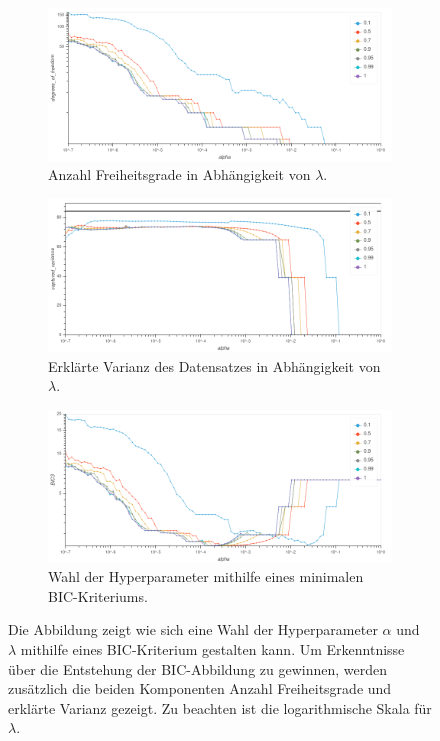 \begin{figure}
\centering
\begin{subfigure}{0.9\textwidth}
\includegraphics[width=\textwidth]{figures/Signal_0_degrees_of_freedom.png}
\caption{Anzahl Freiheitsgrade in Abhängigkeit von $\lambda$.}
\label{results_parameter_benchmark_degrees_of_freedom}
\end{subfigure}
%
\begin{subfigure}{0.9\textwidth}
\includegraphics[width=\textwidth]{figures/Signal_0_explained_variances.png}
\caption{Erklärte Varianz des Datensatzes in Abhängigkeit von $\lambda$.}
\label{results_parameter_benchmark_explained_variance}
\end{subfigure}
%
\begin{subfigure}{0.9\textwidth}
\includegraphics[width=\textwidth]{figures/Signal_0_bic.png}
\caption{Wahl der Hyperparameter mithilfe eines minimalen BIC-Kriteriums.}
\label{results_parameter_benchmark_bic}
\end{subfigure}
\caption{Die Abbildung zeigt wie sich eine Wahl der Hyperparameter $\alpha$ und $\lambda$ mithilfe eines BIC-Kriterium gestalten kann. Um Erkenntnisse über die Entstehung der BIC-Abbildung zu gewinnen, werden zusätzlich die beiden Komponenten Anzahl Freiheitsgrade und erklärte Varianz gezeigt. Zu beachten ist die logarithmische Skala für $\lambda$.}
\label{results_parameter_benchmark}
\end{figure}


